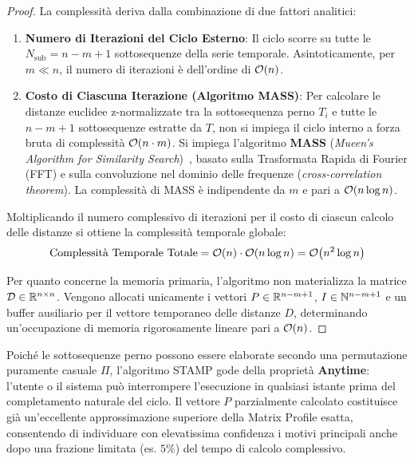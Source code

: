 \begin{proof}
La complessit\`a deriva dalla combinazione di due fattori analitici:
\begin{enumerate}
    \item \textbf{Numero di Iterazioni del Ciclo Esterno}: Il ciclo scorre su tutte le $N_{\text{sub}} = n - m + 1$ sottosequenze della serie temporale. Asintoticamente, per $m \ll n$, il numero di iterazioni \`e dell'ordine di $\mathcal{O}\!\left(n\right)$.
    \item \textbf{Costo di Ciascuna Iterazione (Algoritmo MASS)}: Per calcolare le distanze euclidee z-normalizzate tra la sottosequenza perno $T_i$ e tutte le $n - m + 1$ sottosequenze estratte da $T$, non si impiega il ciclo interno a forza bruta di complessit\`a $\mathcal{O}\!\left(n \cdot m\right)$. Si impiega l'algoritmo \textbf{MASS} (\textit{Mueen's Algorithm for Similarity Search})~\cite{mueen2009}, basato sulla Trasformata Rapida di Fourier (FFT) e sulla convoluzione nel dominio delle frequenze (\textit{cross-correlation theorem}). La complessit\`a di MASS \`e indipendente da $m$ e pari a $\mathcal{O}\!\left(n \log n\right)$.
\end{enumerate}
Moltiplicando il numero complessivo di iterazioni per il costo di ciascun calcolo delle distanze si ottiene la complessit\`a temporale globale:
\begin{equation}
\label{eq:total-time-complexity}
\text{Complessit\`a Temporale Totale} = \mathcal{O}\!\left(n\right) \cdot \mathcal{O}\!\left(n \log n\right) = \mathcal{O}\!\left(n^2 \log n\right)
\end{equation}

Per quanto concerne la memoria primaria, l'algoritmo non materializza la matrice $\mathcal{D} \in \mathbb{R}^{n \times n}$. Vengono allocati unicamente i vettori $P \in \mathbb{R}^{n-m+1}$, $I \in \mathbb{N}^{n-m+1}$ e un buffer ausiliario per il vettore temporaneo delle distanze $D$, determinando un'occupazione di memoria rigorosamente lineare pari a $\mathcal{O}\!\left(n\right)$.
\end{proof}

\begin{remark}
Poich\'e le sottosequenze perno possono essere elaborate secondo una permutazione puramente casuale $\Pi$, l'algoritmo STAMP gode della propriet\`a \textbf{Anytime}: l'utente o il sistema pu\`o interrompere l'esecuzione in qualsiasi istante prima del completamento naturale del ciclo. Il vettore $P$ parzialmente calcolato costituisce gi\`a un'eccellente approssimazione superiore della Matrix Profile esatta, consentendo di individuare con elevatissima confidenza i motivi principali anche dopo una frazione limitata (es. $5\%$) del tempo di calcolo complessivo.
\end{remark}

